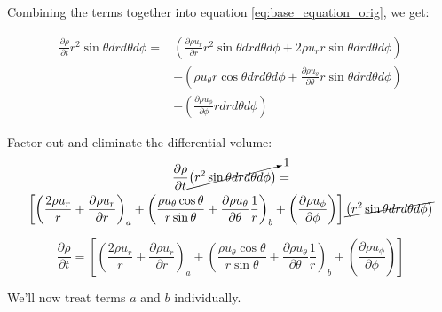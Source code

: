 \documentclass[12pt, letterpaper, twoside]{article}
\begin{document}
    Combining the terms together into equation \ref{eq:base_equation_orig}, we get:

    \begin{equation}
        \begin{split}
        \frac{\partial \rho}{\partial t} r^2 \sin\theta dr d\theta d\phi = &
        \left(\frac{\partial \rho u_r}{\partial r} r^2 \sin\theta dr d\theta d\phi +
        2\rho u_r r\sin\theta dr d\theta d\phi \right) \\
        & + \left(\rho u_{\theta} r\cos\theta dr d\theta d\phi + 
        \frac{\partial\rho u_{\theta}}{\partial\theta} r\sin\theta dr d\theta d\phi \right) \\ 
        & + \left(\frac{\partial \rho u_{\phi}}{\partial \phi} r dr d\theta d\phi \right)
        \end{split}
    \end{equation}

    Factor out and eliminate the differential volume:
    \begin{multline*}
        \frac{\partial \rho}{\partial t} \cancelto{1}{\left( r^2 \sin\theta dr d\theta d\phi \right)} = \\
        \left[
        \left(\frac{2 \rho u_r}{r} + \frac{\partial \rho u_r}{\partial r} \right)_a
        + \left(\frac{\rho u_{\theta} \cos\theta}{r \sin\theta} + 
        \frac{\partial\rho u_{\theta}}{\partial\theta} \frac{1}{r} \right)_b
        + \left(\frac{\partial \rho u_{\phi}}{\partial \phi} \right)
        \right] \cancel{\left( r^2 \sin\theta dr d\theta d\phi \right)}
    \end{multline*}

    \begin{equation}\label{eq:continuitywithaandb}
        \frac{\partial \rho}{\partial t}  =
        \left[
        \left(\frac{2 \rho u_r}{r} + \frac{\partial \rho u_r}{\partial r} \right)_a
        + \left(\frac{\rho u_{\theta} \cos\theta}{r \sin\theta} + 
        \frac{\partial\rho u_{\theta}}{\partial\theta} \frac{1}{r} \right)_b
        + \left(\frac{\partial \rho u_{\phi}}{\partial \phi} \right)
        \right] 
    \end{equation}

    We'll now treat terms \(\boxed{a}\) and \(\boxed{b}\) individually.
\end{document}
